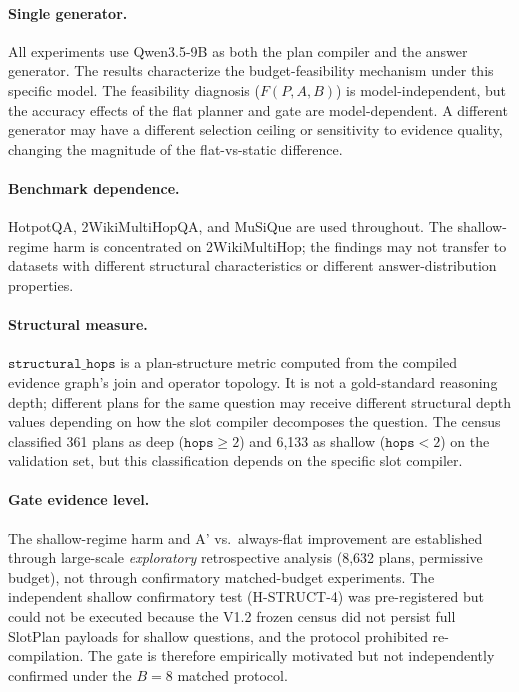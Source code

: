 \paragraph{Single generator.}
All experiments use Qwen3.5-9B as both the plan compiler and the answer generator. The results characterize the budget-feasibility mechanism under this specific model. The feasibility diagnosis ($F(P, A, B)$) is model-independent, but the accuracy effects of the flat planner and gate are model-dependent. A different generator may have a different selection ceiling or sensitivity to evidence quality, changing the magnitude of the flat-vs-static difference.

\paragraph{Benchmark dependence.}
HotpotQA, 2WikiMultiHopQA, and MuSiQue are used throughout. The shallow-regime harm is concentrated on 2WikiMultiHop; the findings may not transfer to datasets with different structural characteristics or different answer-distribution properties.

\paragraph{Structural measure.}
$\texttt{structural\_hops}$ is a plan-structure metric computed from the compiled evidence graph's join and operator topology. It is not a gold-standard reasoning depth; different plans for the same question may receive different structural depth values depending on how the slot compiler decomposes the question. The census classified 361 plans as deep ($\texttt{hops} \geq 2$) and 6,133 as shallow ($\texttt{hops} < 2$) on the validation set, but this classification depends on the specific slot compiler.

\paragraph{Gate evidence level.}
The shallow-regime harm and A' vs.\ always-flat improvement are established through large-scale \emph{exploratory} retrospective analysis (8,632 plans, permissive budget), not through confirmatory matched-budget experiments. The independent shallow confirmatory test (H-STRUCT-4) was pre-registered but could not be executed because the V1.2 frozen census did not persist full SlotPlan payloads for shallow questions, and the protocol prohibited re-compilation. The gate is therefore empirically motivated but not independently confirmed under the $B = 8$ matched protocol.

